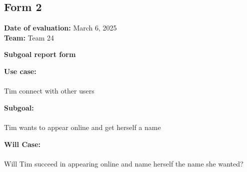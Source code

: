 \documentclass[12pt, titlepage]{article}
\begin{document}
\subsection{Form 2}

\noindent \textbf{Date of evaluation:} March 6, 2025\\
\textbf{Team:} Team 24

\vspace{0.5cm}
\noindent \textbf{\large Subgoal report form}

\vspace{0.3cm}
\noindent \textbf{Use case:} \\\\
Tim connect with other users


\vspace{0.5cm}
\noindent \textbf{Subgoal:} \\\\
Tim wants to appear online and get herself a name

\vspace{0.5cm}
\noindent \textbf{Will Case:} \\\\
Will Tim succeed in appearing online and name herself the name she wanted?
\end{document}
